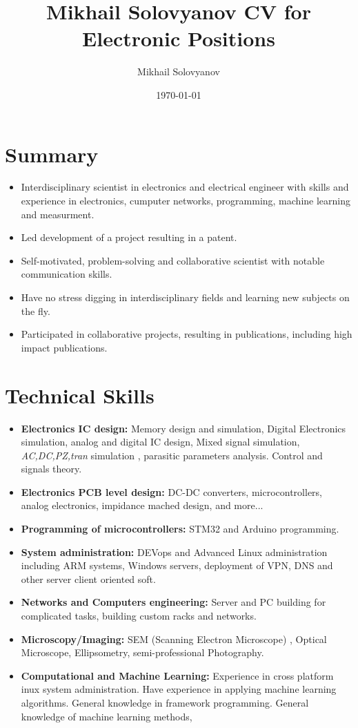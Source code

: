 \documentclass{article}
\title{ Mikhail Solovyanov CV for Electronic Positions}
\author{Mikhail Solovyanov}
\date{\today}
\begin{document}

\makecvtitle %

\section{Summary}
\begin{itemize}
\item Interdisciplinary scientist in electronics and electrical engineer with skills and experience in electronics, cumputer networks, programming, machine learning and measurment.

\item Led development of a  project resulting in a patent.
\item Self-motivated, problem-solving and collaborative scientist with notable communication skills.
\item Have no stress digging in interdisciplinary fields and learning new subjects on the fly.
\item Participated in collaborative projects, resulting in publications, including high impact publications.
\end{itemize}

\section{Technical Skills}

\begin{itemize}
\item \textbf{Electronics IC design:} Memory design and simulation, Digital Electronics simulation, analog and digital IC design, Mixed signal simulation, \textit{AC,DC,PZ,tran} simulation , parasitic parameters analysis. Control and signals theory.
\item \textbf{Electronics PCB level design:} DC-DC converters, microcontrollers, analog electronics, impidance mached design, and more...
\item \textbf{Programming of microcontrollers:} STM32 and Arduino programming.
\item \textbf{System administration:} DEVops and Advanced Linux administration including ARM systems, Windows servers, deployment of VPN, DNS and other server client oriented soft.
\item \textbf{Networks and Computers engineering:} Server and PC building for complicated tasks, building custom racks and networks.
\item \textbf{Microscopy/Imaging:} SEM (Scanning Electron Microscope) , Optical Microscope, Ellipsometry, semi-professional Photography.
\item \textbf{Computational and Machine Learning:} Experience in cross platform inux system administration. Have experience in applying machine learning algorithms. General knowledge in framework programming. General knowledge of machine learning methods,
\end{itemize}
\end{document}
